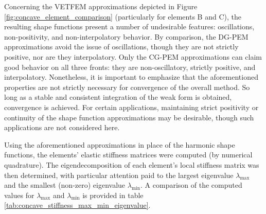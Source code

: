 Concerning the VETFEM approximations depicted in Figure \ref{fig:concave_element_comparison} (particularly for elements B and C), the resulting shape functions present a number of undesirable features: oscillations, non-positivity, and non-interpolatory behavior. By comparison, the DG-PEM approximations avoid the issue of oscillations, though they are not strictly positive, nor are they interpolatory. Only the CG-PEM approximations can claim good behavior on all three fronts: they are non-oscillatory, strictly positive, and interpolatory. Nonetheless, it is important to emphasize that the aforementioned properties are not strictly necessary for convergence of the overall method. So long as a stable and consistent integration of the weak form is obtained, convergence is achieved. For certain applications, maintaining strict positivity or continuity of the shape function approximations may be desirable, though such applications are not considered here.

Using the aforementioned approximations in place of the harmonic shape functions, the elements' elastic stiffness matrices were computed (by numerical quadrature). The eigendecomposition of each element's local stiffness matrix was then determined, with particular attention paid to the largest eigenvalue $\lambda_{\max}$ and the smallest (non-zero) eigenvalue $\lambda_{\min}$. A comparison of the computed values for $\lambda_{\max}$ and $\lambda_{\min}$ is provided in table \ref{tab:concave_stiffness_max_min_eigenvalue}.

